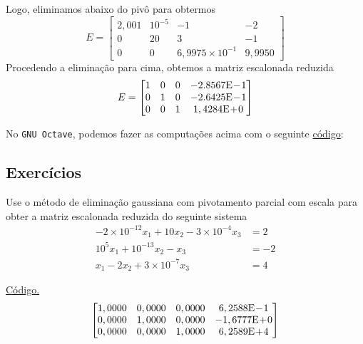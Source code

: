 \begin{ex}
\begin{equation}
  \end{equation}
  Logo, eliminamos abaixo do pivô para obtermos
  \begin{equation}
    E =
    \begin{bmatrix}
      2,001 & 10^{-5} & -1 & -2\\
      0 & 20 & 3 & -1\\
      0 & 0 & 6,9975\times 10^{-1} & 9,9950
    \end{bmatrix}
  \end{equation}
  Procedendo a eliminação para cima, obtemos a matriz escalonada reduzida
  \begin{equation}
    E =
    \begin{bmatrix}
      1 & 0 & 0 & -2.8567\mathrm{E}\!-\!1\\
      0 & 1 & 0 & -2.6425\mathrm{E}\!-\!1\\
      0 & 0 & 1 & 1,4284\mathrm{E}\!+\!0
    \end{bmatrix}
  \end{equation}

\ifisoctave
No \verb+GNU Octave+, podemos fazer as computações acima com o seguinte \href{https://github.com/phkonzen/notas/blob/master/src/MatematicaNumerica/cap_sl_direto/dados/ex_egauss_pivo/ex_egauss_pivo.m}{código}:

\fi
\end{ex}

\subsection*{Exercícios}

\begin{exer}\label{exer:egauss_pivo_exec}
  Use o método de eliminação gaussiana com pivotamento parcial com escala para obter a matriz escalonada reduzida do seguinte sistema
  \begin{align}
    -2\times 10^{-12}x_1 + 10x_2 - 3\times 10^{-4}x_3 &= 2\\
    10^5x_1 + 10^{-13}x_2 - x_3 &= -2\\
    x_1 - 2x_2 + 3\times 10^{-7}x_3 &= 4
  \end{align}
\end{exer}
\begin{resp}
  \ifisoctave 
  \href{https://github.com/phkonzen/notas/blob/master/src/MatematicaNumerica/cap_sl_direto/dados/exer_egauss_pivo_exec/exer_egauss_pivo_exec.m}{Código.} 
  \fi
  $$
  \begin{bmatrix}
   1,0000 &  0,0000 &  0,0000 & 6,2588\mathrm{E}\!-\!1\\
   0,0000 &  1,0000 &  0,0000 & -1,6777\mathrm{E}\!+\!0\\
   0,0000 &  0,0000 &  1,0000 & 6,2589\mathrm{E}\!+\!4
  \end{bmatrix}
  $$
\end{resp}
